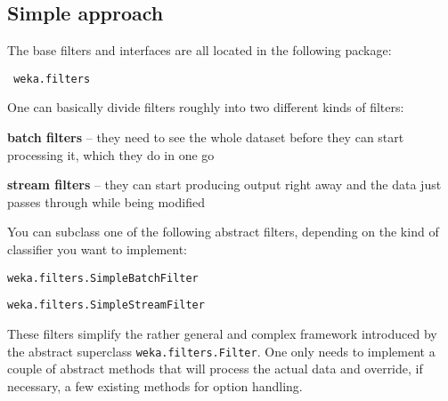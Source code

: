 \subsection{Simple approach}
The base filters and interfaces are all located in the following package:
\begin{verbatim}
 weka.filters
\end{verbatim}
One can basically divide filters roughly into two different kinds of
filters:
\begin{tight_itemize}
  \item \textbf{batch filters} -- they need to see the whole dataset before they
can start processing it, which they do in one go
  \item \textbf{stream filters} -- they can start producing output right away
and the data just passes through while being modified
\end{tight_itemize}
You can subclass one of the following abstract filters, depending on the kind of
classifier you want to implement:
\begin{tight_itemize}
  \item \texttt{weka.filters.SimpleBatchFilter}
  \item \texttt{weka.filters.SimpleStreamFilter}
\end{tight_itemize}
These filters simplify the rather general and complex framework introduced by
the abstract superclass \texttt{weka.filters.Filter}. One only needs to
implement a couple of abstract methods that will process the actual data and
override, if necessary, a few existing methods for option handling.

